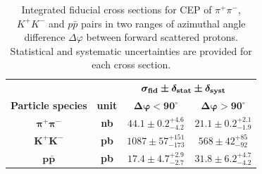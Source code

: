 {
\renewcommand{\arraystretch}{1.5}
\begin{table}[]\centering
\begin{tabular}{c|c|c|c}
	\multicolumn{4}{r}{$\bm{ \sigma_{\text{\bf{fid}}} \pm \delta_{\text{\bf{stat}}} \pm \delta_{\text{\bf{syst}}}}\;\;\;\;\;\;\;\;\;$} \\
	\bf{Particle species} & \bf{unit} & $\bm{\Delta\varphi<90^{\circ}}$ & $\bm{\Delta\varphi>90^{\circ}}$ \\ \hline\hline
	$\bm{\pi^{+}\pi^{-}}$ & \bf{nb} & $44.1\pm0.2^{+4.6}_{-4.2}$ & $21.1\pm0.2^{+2.1}_{-1.9}$ \\ %
	$\bm{K^{+}K^{-}}$ & \bf{pb} & $1087\pm57^{+151}_{-173}$ & $568\pm42^{+85}_{-92}$ \\ %
	$\bm{p\bar{p}}$ & \bf{pb} & $17.4\pm4.7^{+2.9}_{-2.7}$ & $31.8\pm6.2^{+4.7}_{-4.2}$\\ %
\end{tabular}
\caption{Integrated fiducial cross sections for CEP of $\pi^{+}\pi^{-}$, $K^{+}K^{-}$ and $p\bar{p}$ pairs in two ranges of azimuthal angle difference $\Delta\varphi$ between forward scattered protons. Statistical and systematic uncertainties are provided for each cross section.}\label{tab:xSec}
\end{table}
}



